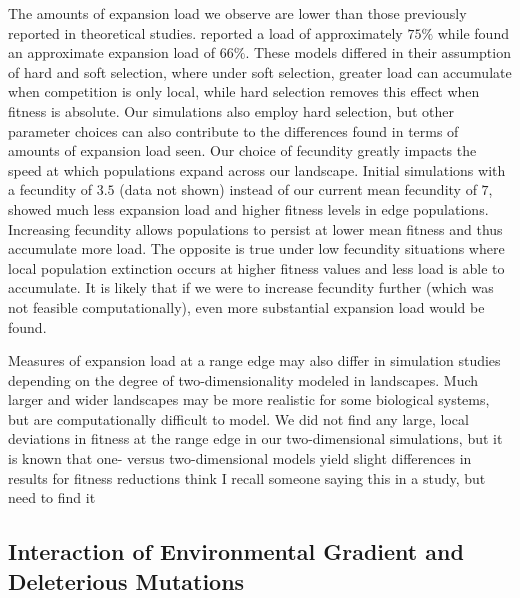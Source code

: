 The amounts of expansion load we observe are lower than those previously reported in theoretical studies. \citet{Peischl:2013} reported a load of approximately $75\%$ while\citet{Peischl:2015} found an approximate expansion load of $66\%$. These models differed in their assumption of hard and soft selection, where under soft selection, greater load can accumulate when competition is only local, while hard selection removes this effect when fitness is absolute. Our simulations also employ hard selection, but other parameter choices can also contribute to the differences found in terms of amounts of expansion load seen. Our choice of fecundity greatly impacts the speed at which populations expand across our landscape. Initial simulations with a fecundity of $3.5$ (data not shown) instead of our current mean fecundity of $7$, showed much less expansion load and higher fitness levels in edge populations. Increasing fecundity allows populations to persist at lower mean fitness and thus accumulate more load. The opposite is true under low fecundity situations where local population extinction occurs at higher fitness values and less load is able to accumulate. It is likely that if we were to increase fecundity further (which was not feasible computationally), even more substantial expansion load would be found.


Measures of expansion load at a range edge may also differ in simulation studies depending on the degree of two-dimensionality modeled in landscapes. Much larger and wider landscapes may be more realistic for some biological systems, but are computationally difficult to model. We did not find any large, local deviations in fitness at the range edge in our two-dimensional simulations, but it is known that one- versus two-dimensional models yield slight differences in results for fitness reductions \color{red} think I recall someone saying this in a study, but need to find it \color{black}



\subsection*{Interaction of Environmental Gradient and Deleterious Mutations}

